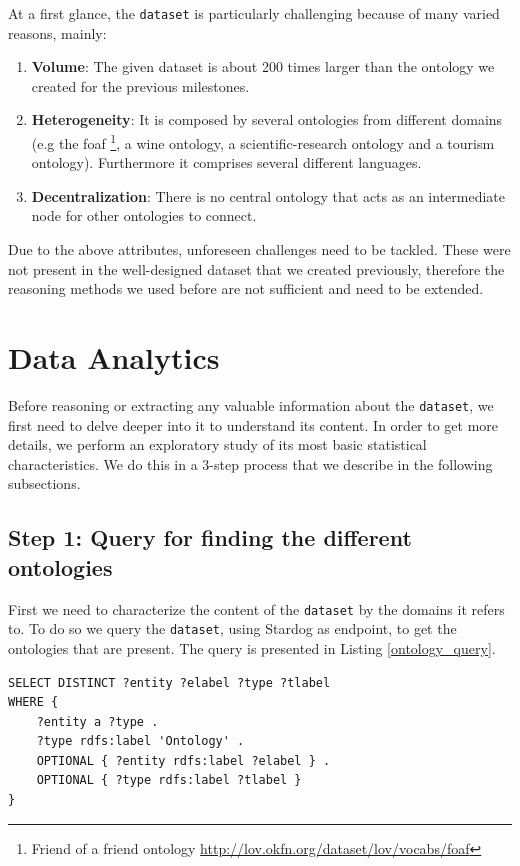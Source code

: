 \documentclass[runningheads,a4paper]{../../StyleFiles/llncs}
\begin{document}
At a first glance, the \texttt{dataset} is particularly challenging because of many varied reasons, mainly:

\begin{enumerate}
	\item \textbf{Volume}: The given dataset is about 200 times larger than the ontology we created for the previous milestones.
	\item \textbf{Heterogeneity}: It is composed by several ontologies from different domains (e.g the foaf \footnote{Friend of a friend ontology \url{http://lov.okfn.org/dataset/lov/vocabs/foaf}}, a wine ontology, a scientific-research ontology and a tourism ontology). Furthermore it comprises several different languages.
	\item \textbf{Decentralization}: There is no central ontology that acts as an intermediate node for other ontologies to connect.
\end{enumerate}

Due to the above attributes, unforeseen challenges need to be tackled. These were not present in the well-designed dataset that we created previously, therefore the reasoning methods we used before are not sufficient and need to be extended.

\section{Data Analytics}
Before reasoning or extracting any valuable information about the \texttt{dataset}, we first need to delve deeper into it to understand its content. In order to get more details, we perform an exploratory study of its most basic statistical characteristics. We do this in a 3-step process that we describe in the following subsections.

\subsection{Step 1: Query for finding the different ontologies}
First we need to characterize the content of the \texttt{dataset} by the domains it refers to. To do so we query the \texttt{dataset}, using Stardog as endpoint, to get the ontologies that are present. The query is presented in Listing \ref{ontology_query}.

\begin{lstlisting}[captionpos=b, caption=SPARQL query for getting different Ontologies in the \texttt{dataset}, label=lst:sparql, basicstyle=\ttfamily\small,frame=bt]
SELECT DISTINCT ?entity ?elabel ?type ?tlabel 
WHERE { 
	?entity a ?type .
	?type rdfs:label 'Ontology' .
	OPTIONAL { ?entity rdfs:label ?elabel } . 
	OPTIONAL { ?type rdfs:label ?tlabel } 
}
\end{lstlisting}
\label{ontology_query}
\end{document}
